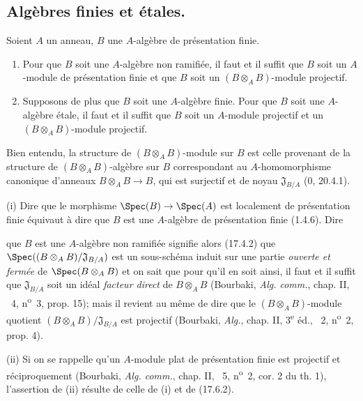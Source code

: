 \subsection{Algèbres finies et étales.}

\begin{proposition}[18.3.1]
\label{IV.18.3.1}
Soient $A$ un anneau, $B$ une $A$-algèbre de présentation finie.
\begin{enumerate}
  \item[(i)] Pour que $B$ soit une $A$-algèbre non ramifiée, il faut et il suffit que $B$ soit un $A$-module de présentation finie et que $B$ soit un $(B\otimes_A B)$-module projectif.
  \item[(ii)] Supposons de plus que $B$ soit une $A$-algèbre finie. Pour que $B$ soit une $A$-algèbre étale, il faut et il suffit que $B$ soit un $A$-module projectif et un $(B\otimes_A B)$-module projectif.
\end{enumerate}
\end{proposition}

Bien entendu, la structure de $(B\otimes_A B)$-module sur $B$ est celle provenant de la structure de $(B\otimes_A B)$-algèbre sur $B$ correspondant au $A$-homomorphisme canonique d'anneaux $B\otimes_A B\to B$, qui est surjectif et de noyau $\mathfrak J_{B/A}$ (0, 20.4.1).

(i) Dire que le morphisme $\Spec(B)\to\Spec(A)$ est localement de présentation finie équivaut à dire que $B$ est une $A$-algèbre de présentation finie (1.4.6). Dire


que $B$ est une $A$-algèbre non ramifiée signifie alors (17.4.2) que $\Spec((B\otimes_A B)/\mathfrak J_{B/A})$ est un sous-schéma induit sur une partie \emph{ouverte et fermée} de $\Spec(B\otimes_A B)$ et on sait que pour qu'il en soit ainsi, il faut et il suffit que $\mathfrak J_{B/A}$ soit un idéal \emph{facteur direct} de $B\otimes_A B$ (Bourbaki, \emph{Alg. comm.}, chap. II, \textsection~4, n\textsuperscript{o}~3, prop. 15); mais il revient au même de dire que le $(B\otimes_A B)$-module quotient $(B\otimes_A B)/\mathfrak J_{B/A}$ est projectif (Bourbaki, \emph{Alg.}, chap. II, 3\textsuperscript{e} éd., \textsection~2, n\textsuperscript{o}~2, prop. 4).

(ii) Si on se rappelle qu'un $A$-module plat de présentation finie est projectif et réciproquement (Bourbaki, \emph{Alg. comm.}, chap. II, \textsection~5, n\textsuperscript{o}~2, cor. 2 du th. 1), l'assertion de (ii) résulte de celle de (i) et de (17.6.2).

